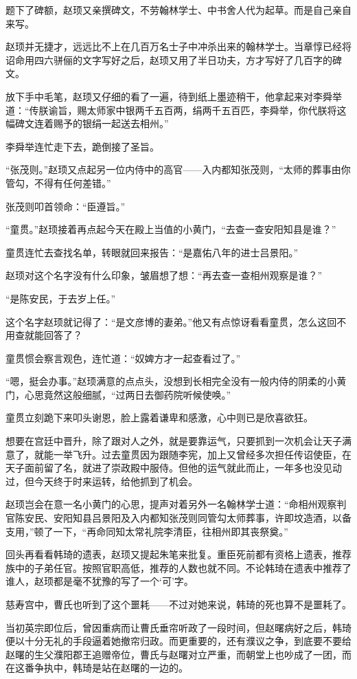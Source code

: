 题下了碑额，赵顼又亲撰碑文，不劳翰林学士、中书舍人代为起草。而是自己亲自来写。

赵顼并无捷才，远远比不上在几百万名士子中冲杀出来的翰林学士。当章惇已经将诏命用四六骈俪的文字写好之后，赵顼又用了半日功夫，方才写好了几百字的碑文。

放下手中毛笔，赵顼又仔细的看了一遍，待到纸上墨迹稍干，他拿起来对李舜举道：“传朕谕旨，赐太师家中银两千五百两，绢两千五百匹，李舜举，你代朕将这幅碑文连着赐予的银绢一起送去相州。”

李舜举连忙走下去，跪倒接了圣旨。

“张茂则。”赵顼又点起另一位内侍中的高官——入内都知张茂则，“太师的葬事由你管勾，不得有任何差错。”

张茂则叩首领命：“臣遵旨。”

“童贯。”赵顼接着再点起今天在殿上当值的小黄门，“去查一查安阳知县是谁？”

童贯连忙去查找名单，转眼就回来报告：“是嘉佑八年的进士吕景阳。”

赵顼对这个名字没有什么印象，皱眉想了想：“再去查一查相州观察是谁？”

“是陈安民，于去岁上任。”

这个名字赵顼就记得了：“是文彦博的妻弟。”他又有点惊讶看看童贯，怎么这回不用查就能回答了？

童贯惯会察言观色，连忙道：“奴婢方才一起查看过了。”

“嗯，挺会办事。”赵顼满意的点点头，没想到长相完全没有一般内侍的阴柔的小黄门，心思竟然这般细腻，“过两日去御药院听候使唤。”

童贯立刻跪下来叩头谢恩，脸上露着谦卑和感激，心中则已是欣喜欲狂。

想要在宫廷中晋升，除了跟对人之外，就是要靠运气，只要抓到一次机会让天子满意了，就能一举飞升。过去童贯因为跟随李宪，加上又曾经多次担任传诏使臣，在天子面前留了名，就进了崇政殿中服侍。但他的运气就此而止，一年多也没见动过，但今天终于时来运转，给他抓到了机会。

赵顼岂会在意一名小黄门的心思，提声对着另外一名翰林学士道：“命相州观察判官陈安民、安阳知县吕景阳及入内都知张茂则同管勾太师葬事，许即坟造酒，以备支用，”顿了一下，“再命同知太常礼院李清臣，往相州即其丧祭奠。”

回头再看看韩琦的遗表，赵顼又提起朱笔来批复。重臣死前都有资格上遗表，推荐族中的子弟任官。按照官职高低，推荐的人数也就不同。不论韩琦在遗表中推荐了谁人，赵顼都是毫不犹豫的写了一个‘可’字。

慈寿宫中，曹氏也听到了这个噩耗——不过对她来说，韩琦的死也算不是噩耗了。

当初英宗即位后，曾因重病而让曹氏垂帘听政了一段时间，但赵曙病好之后，韩琦便以十分无礼的手段逼着她撤帘归政。而更重要的，还有濮议之争，到底要不要给赵曙的生父濮阳郡王追赠帝位，曹氏与赵曙对立严重，而朝堂上也吵成了一团，而在这番争执中，韩琦是站在赵曙的一边的。

